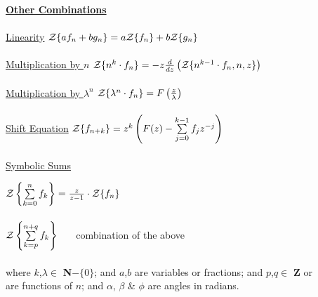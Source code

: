 \begin{tabbing}
\underline {{\bf Other Combinations}}\= \\ \\

\underline {Linearity}
  \>${\cal Z} \{a f_n+b g_n \} = a{\cal Z} \{f_n\}+b{\cal Z}\{g_n\}$
  \\ \\
\underline {Multiplication by $n$}
  \>${\cal Z} \{n^k \cdot f_n\} = -z \frac{d}{dz} \left({\cal Z}\{n^{k-1} \cdot f_n,n,z\} \right)$
  \\ \\
\underline {Multiplication by $\lambda^n$}
  \>${\cal Z} \{\lambda^n \cdot f_n\}=F \left(\frac{z}{\lambda}\right)$
  \\ \\
\underline {Shift Equation}
  \>${\cal Z} \{f_{n+k}\} = 
           z^k \left(F(z) - \sum\limits^{k-1}_{j=0} f_j z^{-j}\right)$
  \\ \\
\underline {Symbolic Sums}

  \> ${\cal Z} \left\{ \sum\limits_{k=0}^{n} f_k \right\} =
                       \frac{z}{z-1} \cdot {\cal Z} \{f_n\}$ \\ \\

  \>${\cal Z} \left\{ \sum\limits_{k=p}^{n+q} f_k \right\}$
  \ \ \ combination of the above \\ \\
  where $k$,$\lambda \in$ {\bf N}$- \{0\}$; and $a$,$b$ are variables
  or fractions; and $p$,$q \in$ {\bf Z} or \\ 
  are functions of $n$; and $\alpha$, $\beta$ \& $\phi$ are angles 
  in radians.
\end{tabbing}

